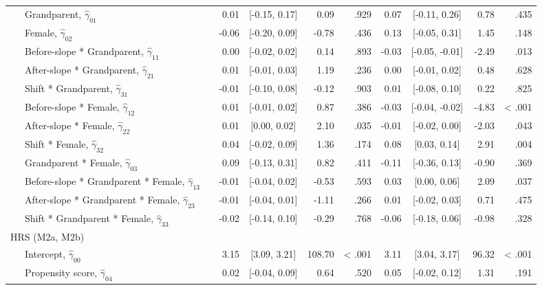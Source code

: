 \documentclass[
  english,
  man, noextraspace]{apa7}
\newenvironment{lltable}{\begin{landscape}\begin{center}\begin{ThreePartTable}}{\end{ThreePartTable}\end{center}\end{landscape}}
\begin{document}
\begin{lltable}
{\begin{longtable}{lrcrrrcrr}
\ \ \ Grandparent, $\hat{\gamma}_{01}$ \textcolor{white}{L} & 0.01 & [-0.15, 0.17] & 0.09 & .929 & 0.07 & [-0.11, 0.26] & 0.78 & .435\\
\ \ \ Female, $\hat{\gamma}_{02}$ \textcolor{white}{L} & -0.06 & [-0.20, 0.09] & -0.78 & .436 & 0.13 & [-0.05, 0.31] & 1.45 & .148\\
\ \ \ Before-slope * Grandparent, $\hat{\gamma}_{11}$ \textcolor{white}{L} & 0.00 & [-0.02, 0.02] & 0.14 & .893 & -0.03 & [-0.05, -0.01] & -2.49 & .013\\
\ \ \ After-slope * Grandparent, $\hat{\gamma}_{21}$ \textcolor{white}{L} & 0.01 & [-0.01, 0.03] & 1.19 & .236 & 0.00 & [-0.01, 0.02] & 0.48 & .628\\
\ \ \ Shift * Grandparent, $\hat{\gamma}_{31}$ \textcolor{white}{L} & -0.01 & [-0.10, 0.08] & -0.12 & .903 & 0.01 & [-0.08, 0.10] & 0.22 & .825\\
\ \ \ Before-slope * Female, $\hat{\gamma}_{12}$ \textcolor{white}{L} & 0.01 & [-0.01, 0.02] & 0.87 & .386 & -0.03 & [-0.04, -0.02] & -4.83 & < .001\\
\ \ \ After-slope * Female, $\hat{\gamma}_{22}$ \textcolor{white}{L} & 0.01 & [0.00, 0.02] & 2.10 & .035 & -0.01 & [-0.02, 0.00] & -2.03 & .043\\
\ \ \ Shift * Female, $\hat{\gamma}_{32}$ \textcolor{white}{L} & 0.04 & [-0.02, 0.09] & 1.36 & .174 & 0.08 & [0.03, 0.14] & 2.91 & .004\\
\ \ \ Grandparent * Female, $\hat{\gamma}_{03}$ \textcolor{white}{L} & 0.09 & [-0.13, 0.31] & 0.82 & .411 & -0.11 & [-0.36, 0.13] & -0.90 & .369\\
\ \ \ Before-slope * Grandparent * Female, $\hat{\gamma}_{13}$ \textcolor{white}{L} & -0.01 & [-0.04, 0.02] & -0.53 & .593 & 0.03 & [0.00, 0.06] & 2.09 & .037\\
\ \ \ After-slope * Grandparent * Female, $\hat{\gamma}_{23}$ \textcolor{white}{L} & -0.01 & [-0.04, 0.01] & -1.11 & .266 & 0.01 & [-0.02, 0.03] & 0.71 & .475\\
\ \ \ Shift * Grandparent * Female, $\hat{\gamma}_{33}$ \textcolor{white}{L} & -0.02 & [-0.14, 0.10] & -0.29 & .768 & -0.06 & [-0.18, 0.06] & -0.98 & .328\\
HRS (M2a, M2b) &  &  &  &  &  &  &  & \\
\ \ \ Intercept, $\hat{\gamma}_{00}$ \textcolor{white}{H} & 3.15 & [3.09, 3.21] & 108.70 & < .001 & 3.11 & [3.04, 3.17] & 96.32 & < .001\\
\ \ \ Propensity score, $\hat{\gamma}_{04}$ \textcolor{white}{H} & 0.02 & [-0.04, 0.09] & 0.64 & .520 & 0.05 & [-0.02, 0.12] & 1.31 & .191\\

\end{longtable}}
\end{lltable}
\end{document}
